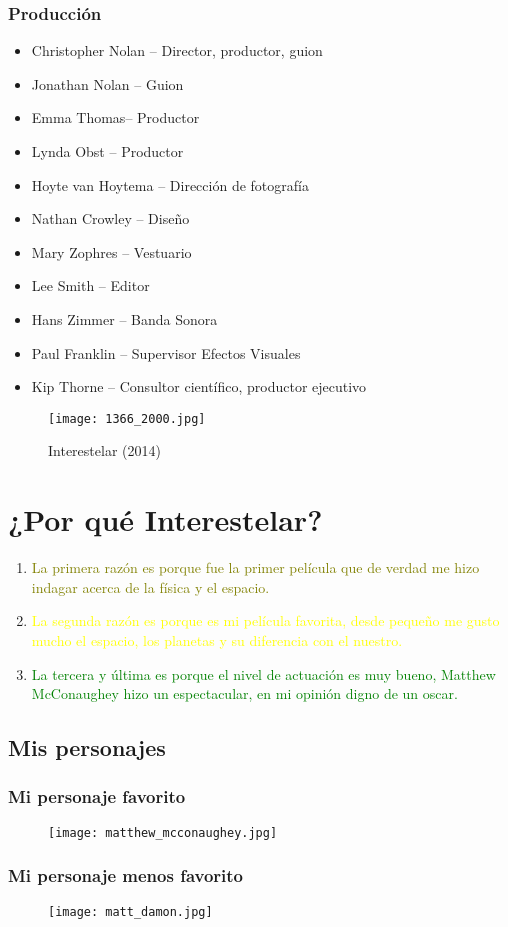 \documentclass[a4paper, 11pt]{article}
\begin{document}
\begin{itemize}
  \subsubsection{Producción}
  \begin{itemize}
   \item Christopher Nolan – Director, productor, guion
   \item Jonathan Nolan – Guion
   \item Emma Thomas– Productor
   \item Lynda Obst – Productor
   \item Hoyte van Hoytema – Dirección de fotografía
   \item Nathan Crowley – Diseño
   \item Mary Zophres – Vestuario
   \item Lee Smith – Editor
   \item Hans Zimmer – Banda Sonora
   \item Paul Franklin – Supervisor Efectos Visuales
   \item Kip Thorne – Consultor científico, productor ejecutivo
  \end{itemize}
  \end{itemize}
\begin{figure}[H]
\raggedleft
\texttt{[image: 1366\_2000.jpg]}
\caption{\raggedleft}{Interestelar (2014)}
\label{fig:my_label}
\end{figure}

\section{¿Por qué Interestelar?}

\begin{enumerate}
    \item {\textcolor{olive}{La primera razón es porque fue la primer película que de verdad me hizo indagar acerca de la física y el espacio.}}
    \item {\textcolor{yellow}{La segunda razón es porque es mi película favorita, desde pequeño me gusto mucho el espacio, los planetas y su diferencia con el nuestro.}}
    \item {\textcolor{green}{La tercera y última es porque el nivel de actuación es muy bueno, Matthew McConaughey hizo un espectacular, en mi opinión digno de un oscar.}}
\end{enumerate}

\subsection{Mis personajes}
\subsubsection{Mi personaje favorito}
\begin{figure}[H]
\raggedleft
\texttt{[image: matthew\_mcconaughey.jpg]}
\end{figure}
\subsubsection{Mi personaje menos favorito}
\begin{figure}[H]
\raggedleft
\texttt{[image: matt\_damon.jpg]}
\end{figure}
\end{document}

